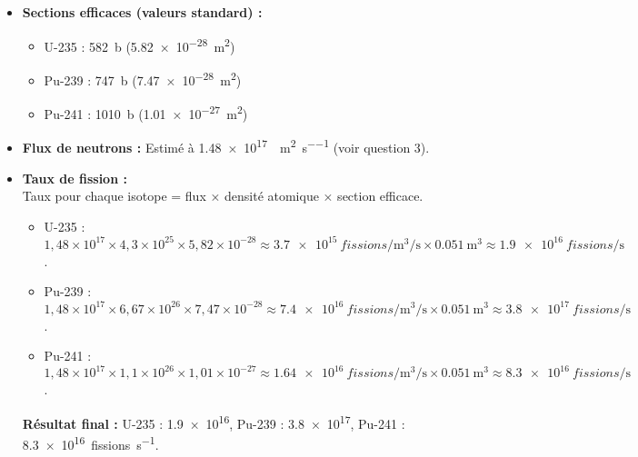\documentclass[12pt,a4paper]{article}
\begin{document}
\begin{itemize}
\begin{itemize}
\begin{itemize}
        \end{itemize}
    \end{itemize}
  \item \textbf{Sections efficaces (valeurs standard) :}
    \begin{itemize}
      \item U-235 : \SI{582}{\barn} (\SI{5,82e-28}{\square\meter})
      \item Pu-239 : \SI{747}{\barn} (\SI{7,47e-28}{\square\meter})
      \item Pu-241 : \SI{1010}{\barn} (\SI{1,01e-27}{\square\meter})
    \end{itemize}
  \item \textbf{Flux de neutrons :} Estimé à \SI{1,48e17}{\neutron\per\meter\squared\per\second} (voir question 3).
  \item \textbf{Taux de fission :}\\
    Taux pour chaque isotope = flux × densité atomique × section efficace.
    \begin{itemize}
      \item U-235 : $1,48 \times 10^{17} \times 4,3 \times 10^{25} \times 5,82 \times 10^{-28} \approx \SI{3,7e15}{fissions\per\cubic\meter\per\second} \times \SI{0,051}{\cubic\meter} \approx \SI{1,9e16}{fissions\per\second}$.
      \item Pu-239 : $1,48 \times 10^{17} \times 6,67 \times 10^{26} \times 7,47 \times 10^{-28} \approx \SI{7,4e16}{fissions\per\cubic\meter\per\second} \times \SI{0,051}{\cubic\meter} \approx \SI{3,8e17}{fissions\per\second}$.
      \item Pu-241 : $1,48 \times 10^{17} \times 1,1 \times 10^{26} \times 1,01 \times 10^{-27} \approx \SI{1,64e16}{fissions\per\cubic\meter\per\second} \times \SI{0,051}{\cubic\meter} \approx \SI{8,3e16}{fissions\per\second}$.
    \end{itemize}
    \textbf{Résultat final :} U-235 : \SI{1,9e16}{}, Pu-239 : \SI{3,8e17}{}, Pu-241 : \SI{8,3e16}{fissions\per\second}.
\end{itemize}
\end{document}
